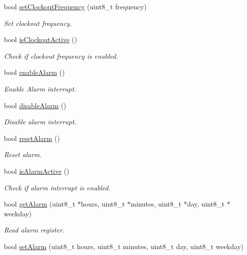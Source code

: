 \begin{DoxyCompactItemize}
bool \hyperlink{namespacePcf8563_a4bc96bd7ccbd30db659536befb3da1fe}{set\+Clockout\+Frequency} (uint8\+\_\+t frequency)
\begin{DoxyCompactList}\small\item\em Set clockout frequency. \end{DoxyCompactList}\item 
bool \hyperlink{namespacePcf8563_ab8ff6484e7a5636187e0212a98f623bf}{is\+Clockout\+Active} ()
\begin{DoxyCompactList}\small\item\em Check if clockout frequency is enabled. \end{DoxyCompactList}\item 
bool \hyperlink{namespacePcf8563_a6e196fe410c080e4f6e20aadbe279637}{enable\+Alarm} ()
\begin{DoxyCompactList}\small\item\em Enable Alarm interrupt. \end{DoxyCompactList}\item 
bool \hyperlink{namespacePcf8563_ad9dd3fe9bf1ab196090357b717c7207d}{disable\+Alarm} ()
\begin{DoxyCompactList}\small\item\em Disable alarm interrupt. \end{DoxyCompactList}\item 
bool \hyperlink{namespacePcf8563_ae554435cc17a3e49d9d731b97e3fc0be}{reset\+Alarm} ()
\begin{DoxyCompactList}\small\item\em Reset alarm. \end{DoxyCompactList}\item 
bool \hyperlink{namespacePcf8563_a23086671303b630318e82e9bef662b44}{is\+Alarm\+Active} ()
\begin{DoxyCompactList}\small\item\em Check if alarm interrupt is enabled. \end{DoxyCompactList}\item 
bool \hyperlink{namespacePcf8563_a687f6854cf03080456bdd8596c1c60ff}{get\+Alarm} (uint8\+\_\+t $\ast$hours, uint8\+\_\+t $\ast$minutes, uint8\+\_\+t $\ast$day, uint8\+\_\+t $\ast$weekday)
\begin{DoxyCompactList}\small\item\em Read alarm register. \end{DoxyCompactList}\item 
bool \hyperlink{namespacePcf8563_ad82df13e3625c1b975f2cc2e7e356f0e}{set\+Alarm} (uint8\+\_\+t hours, uint8\+\_\+t minutes, uint8\+\_\+t day, uint8\+\_\+t weekday)

\end{DoxyCompactItemize}

